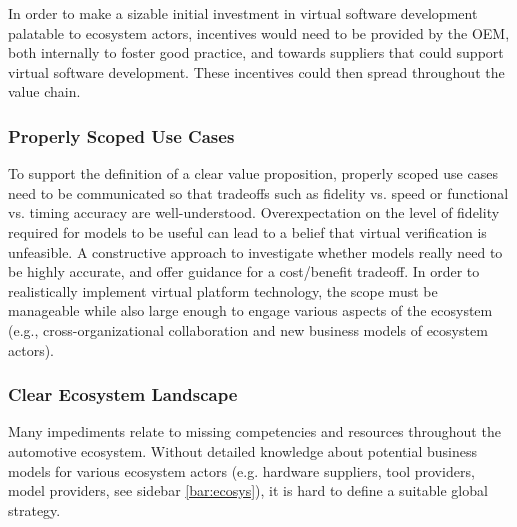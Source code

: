 In order to make a sizable initial investment in virtual software development palatable to ecosystem actors,
incentives would need to be provided by the OEM,
both internally to foster good practice, and towards suppliers that could support virtual software development.
These incentives could then spread throughout the value chain.

\subsubsection*{Properly Scoped Use Cases}
To support the definition of a clear value proposition,
properly scoped use cases need to be  communicated so that tradeoffs such as fidelity vs. speed or functional vs. timing accuracy are well-understood.
Overexpectation on the level of fidelity required for models to be useful can lead to a belief that virtual verification is unfeasible.
A constructive approach  to investigate whether models really need to be highly accurate, and offer guidance for a cost/benefit tradeoff.
In order to realistically implement virtual platform technology,
the scope must be manageable while also large enough to engage various aspects of the ecosystem
(e.g., cross-organizational collaboration and new business models of ecosystem actors).

\subsubsection*{Clear Ecosystem Landscape}
Many impediments relate to missing competencies and resources throughout the automotive ecosystem. 
Without detailed knowledge about potential business models for various ecosystem actors (e.g. hardware suppliers, tool providers, model providers, see sidebar \ref{bar:ecosys}), it is hard to define a suitable global strategy. 




